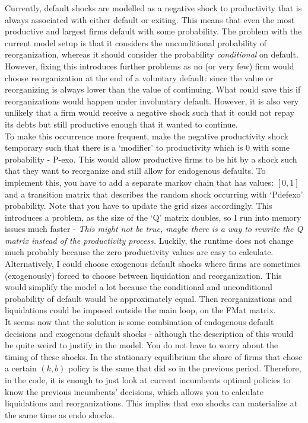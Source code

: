 \documentclass[12pt]{article}
\begin{document}
Currently, default shocks are modelled as a negative shock to productivity that is always associated with either default or exiting. This means that even the most productive and largest firms default with some probability. The problem with the current model setup is that it considers the unconditional probability of reorganization, whereas it should consider the probability \textit{conditional} on default. However, fixing this introduces further problems as no (or very few) firm would choose reorganization at the end of a voluntary default: since the value or reorganizing is always lower than the value of continuing. What could save this if reorganizations  would happen under involuntary default. However, it is also very unlikely that a firm would receive a negative shock such that it could not repay its debts but still productive enough that it wanted to continue. \vspace{3mm} \\ 
To make this occurrence more frequent, make the negative productivity shock temporary such that there is a `modifier' to productivity which is 0 with some probability - P-exo. This would allow productive firms to be hit by a shock such that they want to reorganize and still allow for endogenous defaults. To implement this, you have to add a separate markov chain that has values: $[0,1]$ and a transition matrix that describes the random shock occurring with `Pdefexo' probability.  Note that you have to update the grid sizes accordingly. This introduces a problem, as the size of the `Q' matrix doubles, so I run into memory issues much faster - \textit{This might not be true, maybe there is a way to rewrite the Q matrix instead of the productivity process.} Luckily, the runtime does not change much probably because the zero productivity values are easy to calculate.  \vspace{3mm} \\
Alternatively, I could choose exogenous default shocks where firms are sometimes (exogenously) forced to choose between liquidation and reorganization. This would simplify the model a lot because the conditional and unconditional probability of default would be approximately equal. Then reorganizations and liquidations could be imposed outside the main loop, on the FMat matrix. \vspace{3mm} \\
It seems now that the solution is some combination of endogenous default decisions and exogenous default shocks - although the description of this would be quite weird to justify in the model. You do not have to worry about the timing of these shocks. In the stationary equilibrium the share of firms that chose a certain $(k,b)$ policy is the same that did so in the previous period. Therefore, in the code, it is enough to just look at current incumbents optimal policies to know the previous incumbents' decisions, which allows you to calculate liquidations and reorganizations. This implies that exo shocks can materialize at the same time as endo shocks.  \vspace{3mm} \\
\end{document}
